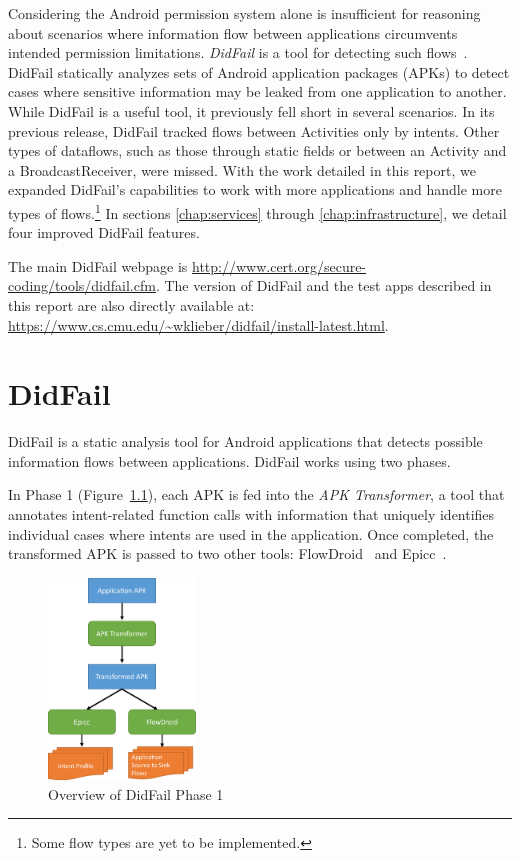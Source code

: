 Considering the Android permission system alone is insufficient for reasoning about scenarios where information flow between applications circumvents intended permission limitations. \emph{DidFail} is a tool for detecting such flows~\cite{didfail}. DidFail statically analyzes sets of Android application packages (APKs) to detect cases where sensitive information may be leaked from one application to another. While DidFail is a useful tool, it previously fell short in several scenarios. In its previous release, DidFail tracked flows between Activities only by intents. Other types of dataflows, such as those through static fields or between an Activity and a BroadcastReceiver, were missed. With the work detailed in this report, we expanded DidFail's capabilities to work with more applications and handle more types of flows.\footnote{Some flow types are yet to be implemented.} In sections \ref{chap:services} through \ref{chap:infrastructure}, we detail four improved DidFail features.

The main DidFail webpage is \url{http://www.cert.org/secure-coding/tools/didfail.cfm}.  The version of DidFail and the test apps described in this report are also directly available at: 
\\ \url{https://www.cs.cmu.edu/~wklieber/didfail/install-latest.html}.

\chapter{DidFail}

DidFail is a static analysis tool for Android applications that detects possible information flows between applications. DidFail works using two phases.

In Phase 1 (Figure~\ref{fig:overview_phase1}), each APK is fed into the \emph{APK Transformer}, a tool that annotates intent-related function calls with information that uniquely identifies individual cases where intents are used in the application. Once completed, the transformed APK is passed to two other tools: FlowDroid~\cite{flowdroid} and Epicc~\cite{epicc}.

\begin{figure}[h]
	\centering
	\includegraphics[width=0.35\textwidth]{didfail1.pdf}
	\caption{Overview of DidFail Phase 1}
	\label{fig:overview_phase1}
\end{figure}

